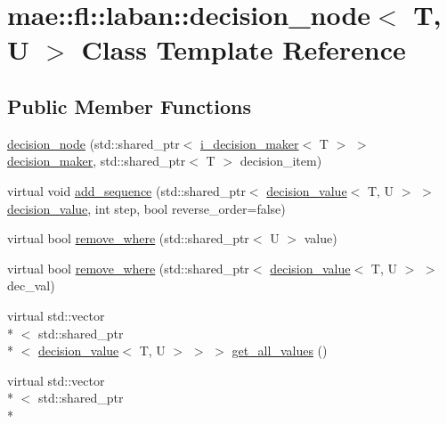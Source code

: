 \hypertarget{classmae_1_1fl_1_1laban_1_1decision__node}{\section{mae\-:\-:fl\-:\-:laban\-:\-:decision\-\_\-node$<$ T, U $>$ Class Template Reference}
\label{classmae_1_1fl_1_1laban_1_1decision__node}
}
\subsection*{Public Member Functions}
\begin{DoxyCompactItemize}
\item 
\hyperlink{classmae_1_1fl_1_1laban_1_1decision__node_a3c90c6a24b41775eb5ce8fd259105db7}{decision\-\_\-node} (std\-::shared\-\_\-ptr$<$ \hyperlink{classmae_1_1fl_1_1laban_1_1i__decision__maker}{i\-\_\-decision\-\_\-maker}$<$ T $>$ $>$ \hyperlink{classmae_1_1fl_1_1laban_1_1decision__maker}{decision\-\_\-maker}, std\-::shared\-\_\-ptr$<$ T $>$ decision\-\_\-item)
\item 
virtual void \hyperlink{classmae_1_1fl_1_1laban_1_1decision__node_a90eeaa6db12b3c84ebf699f1a4e21e1a}{add\-\_\-sequence} (std\-::shared\-\_\-ptr$<$ \hyperlink{classmae_1_1fl_1_1laban_1_1decision__value}{decision\-\_\-value}$<$ T, U $>$ $>$ \hyperlink{classmae_1_1fl_1_1laban_1_1decision__value}{decision\-\_\-value}, int step, bool reverse\-\_\-order=false)
\item 
virtual bool \hyperlink{classmae_1_1fl_1_1laban_1_1decision__node_ab5aa2291848fd19563f7069ac9c67799}{remove\-\_\-where} (std\-::shared\-\_\-ptr$<$ U $>$ value)
\item 
virtual bool \hyperlink{classmae_1_1fl_1_1laban_1_1decision__node_a339862b47afb685f6d09fadd596bec60}{remove\-\_\-where} (std\-::shared\-\_\-ptr$<$ \hyperlink{classmae_1_1fl_1_1laban_1_1decision__value}{decision\-\_\-value}$<$ T, U $>$ $>$ dec\-\_\-val)
\item 
virtual std\-::vector\\*
$<$ std\-::shared\-\_\-ptr\\*
$<$ \hyperlink{classmae_1_1fl_1_1laban_1_1decision__value}{decision\-\_\-value}$<$ T, U $>$ $>$ $>$ \hyperlink{classmae_1_1fl_1_1laban_1_1decision__node_a2c770665666731e6cd69b157f696ab7b}{get\-\_\-all\-\_\-values} ()
\item 
virtual std\-::vector\\*
$<$ std\-::shared\-\_\-ptr\\*

\end{DoxyCompactItemize}

